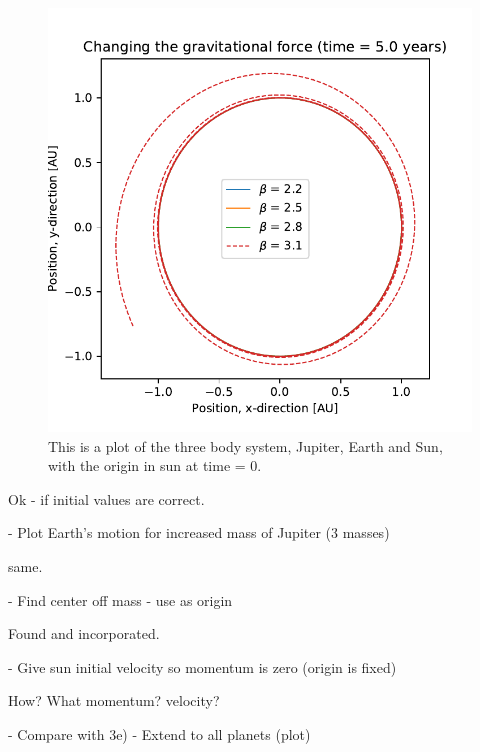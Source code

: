 \begin{figure}[H]
\includegraphics[width=1.1\linewidth]{../results/plots/diffenrent_gravitation.pdf}\caption{This is a plot of the three body system, Jupiter, Earth and Sun, with the origin in sun at time = 0.}\label{fig:three_body_sun_origin}
\end{figure}	

	Ok - if initial values are correct.
	
	- Plot Earth's motion for increased mass of Jupiter (3 masses)

	same.	
	
	- Find center off mass - use as origin

	Found and incorporated.	
	
	- Give sun initial velocity so momentum is zero (origin is fixed)

	How? What momentum? velocity?	
	
	- Compare with 3e)
	- Extend to all planets (plot)
	
